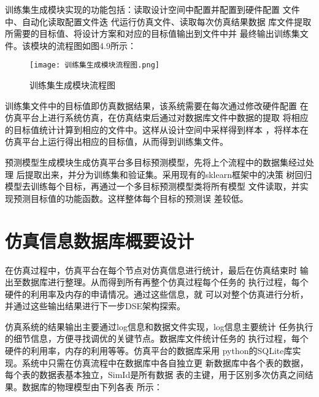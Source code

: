 训练集生成模块实现的功能包括：读取设计空间中配置并配置到硬件配置
文件中、自动化读取配置文件迭  代运行仿真文件、读取每次仿真结果数据
库文件提取所需要的目标值、将设计方案和对应的目标值输出到文件中并
最终输出训练集文件。该模块的流程图如图4.9所示：

\begin{figure}[htb]
    \centering
    \texttt{[image: 训练集生成模块流程图.png]}
    \caption{训练集生成模块流程图}
    \label{fig:badge}
\end{figure}

训练集文件中的目标值即仿真数据结果，该系统需要在每次通过修改硬件配置
在仿真平台上进行系统仿真，在仿真结束后通过对数据库文件中数据的提取
将相应的目标值统计计算到相应的文件中。这样从设计空间中采样得到样本
，将样本在仿真平台上运行得出相应的目标值，从而得到训练集文件。

预测模型生成模块生成仿真平台多目标预测模型，先将上个流程中的数据集经过处理
后提取出来，并分为训练集和验证集。采用现有的sklearn框架中的决策
树回归模型\cite{34}去训练每个目标，再通过一个多目标预测模型类将所有模型
文件读取，并实现预测目标值的功能函数。这样整体每个目标的预测误
差较低。

\section{仿真信息数据库概要设计}
在仿真过程中，仿真平台在每个节点对仿真信息进行统计，最后在仿真结束时
输出至数据库进行整理。从而得到所有再整个仿真过程每个任务的
执行过程，每个硬件的利用率及内存的申请情况。通过这些信息，就
可以对整个仿真进行分析，并通过这些输出结果进行下一步DSE架构探索。

仿真系统的结果输出主要通过log信息和数据文件实现，log信息主要统计
任务执行的细节信息，方便寻找调优的关键节点。数据库文件统计任务的
执行过程，每个硬件的利用率，内存的利用等等。仿真平台的数据库采用
python的SQLite库实现。系统中只需在仿真流程中在数据库中各自独立更
新数据库中各个表的数据，每个表的数据表基本独立，SimId是所有数据
表的主键，用于区别多次仿真之间结果。数据库的物理模型由下列各表
所示：

